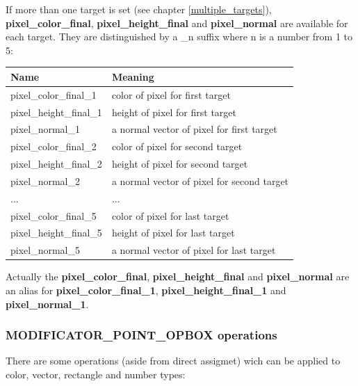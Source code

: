 \documentclass[9pt]{article}
\begin{document}
If more than one target is set (see chapter \ref{multiple_targets}), 
{\bf pixel\_color\_final}, {\bf pixel\_height\_final} and {\bf pixel\_normal}
are available for each target. They are distinguished by a \_n suffix where
n is a number from 1 to 5:

\begin{center}
\begin{tabular}{|l||l|}
\hline
Name & Meaning \\
\hline
\hline
pixel\_color\_final\_1 & color of pixel for first target \\
pixel\_height\_final\_1 & height of pixel for first target \\
pixel\_normal\_1 & a normal vector of pixel for first target \\
\hline
pixel\_color\_final\_2 & color of pixel for second target \\
pixel\_height\_final\_2 & height of pixel for second target \\
pixel\_normal\_2 & a normal vector of pixel for second target \\
\hline
... & ... \\
\hline
pixel\_color\_final\_5 & color of pixel for last target \\
pixel\_height\_final\_5 & height of pixel for last target \\
pixel\_normal\_5 & a normal vector of pixel for last target \\
\hline
\end{tabular}
\end{center}

Actually the {\bf pixel\_color\_final}, {\bf pixel\_height\_final} and {\bf pixel\_normal}
are an alias for {\bf pixel\_color\_final\_1}, {\bf pixel\_height\_final\_1} and {\bf pixel\_normal\_1}.

\subsubsection*{MODIFICATOR\_POINT\_OPBOX operations}

There are some operations (aside from direct assigmet) wich can be applied to 
color, vector, rectangle and number types:
\end{document}
